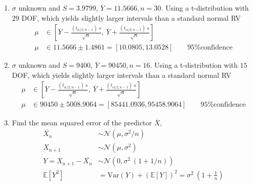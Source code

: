 \begin{enumerate}
\begin{subequations}
\begin{figure}[H]
\begin{tikzpicture}
\begin{axis}[width = 0.75\textwidth,xlabel=$n$, ylabel=$ P \left\{\chi_n^2 \leq (n-1)\ 1.8 \right\}  $, grid = both, ytick = {2.4, 2.6, e, 2.8, 2.9, 3.0}, yticklabels = {2.4, 2.6, e, 2.8, 2.9, 3.0}]
					\draw [thick, draw=red,] (axis cs: -1000, e ) -- (axis cs: 11000,  e );
				\end{axis}
			\end{tikzpicture}
		\end{figure}
	\end{subequations}

	\item $ \sigma $ unknown and $ S = 3.9799 $, $ \overline{Y} = 11.5666, n = 30$. Using a t-distribution with $ 29 $ DOF, which yields slightly larger intervals than a standard normal RV\\
	\begin{subequations}
		\begin{align}
			\mu &\in \left[ \overline{Y} - \frac{(t_{\alpha/2, n-1})\ s}{\sqrt{n}}, \ \overline{Y} + \frac{(t_{\alpha/2, n-1})\ s}{\sqrt{n}} \right] \nonumber \\
			\mu &\in 11.5666 \pm 1.4861 = [10.0805, 13.0528] \qquad \text{95\% confidence} 
		\end{align}
	\end{subequations}
	
	\item $ \sigma $ unknown and $ S = 9400 $, $ \overline{Y} = 90450, n = 16$. Using a t-distribution with $ 15 $ DOF, which yields slightly larger intervals than a standard normal RV\\
	\begin{subequations}
		\begin{align}
			\mu &\in \left[ \overline{Y} - \frac{(t_{\alpha/2, n-1})\ s}{\sqrt{n}}, \ \overline{Y} + \frac{(t_{\alpha/2, n-1})\ s}{\sqrt{n}} \right] \nonumber \\
			\mu &\in 90450 \pm 5008.9064 = [85441.0936, 95458.9064] \qquad \text{95\% confidence} 
		\end{align}
	\end{subequations}

	\item Find the mean squared error of the predictor $ \overline{X} $,
	\begin{subequations}
		\begin{align}
			\overline{X_n} &\sim \mathcal{N}(\mu, \sigma^2/n) \nonumber \\
			X_{n+1} &\sim \mathcal{N}(\mu, \sigma^2) \nonumber \\
			Y = X_{n+1} - \overline{X_n} &\sim \mathcal{N}(0, \sigma^2\ (1+1/n))\nonumber \\
			\mathbb{E}[Y^2] &= \mathrm{Var}(Y) + \left(\mathbb{E}[Y]\right)^2 = \sigma^2\ \left(1+\frac{1}{n}\right)
		\end{align}
	\end{subequations}


\end{enumerate}
